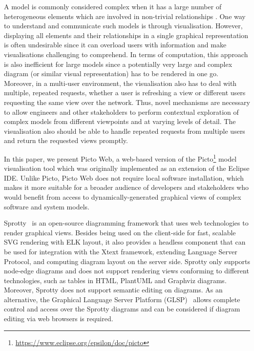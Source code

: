 \documentclass[preprint,12pt, a4paper]{elsarticle}
\begin{document}
A model is commonly considered complex when it has a large number of heterogeneous elements which are involved in non-trivial relationships \cite{boccara2010complex,klosterman2012complex}. One way to understand and communicate such models is through visualisation. However, displaying all elements and their relationships in a single graphical representation is often undesirable since it can overload users with information and make visualisations challenging to comprehend. In terms of computation, this approach is also inefficient for large models since a potentially very large and complex diagram (or similar visual representation) has to be rendered in one go. 
Moreover, in a multi-user environment, the visualisation also has to deal with multiple, repeated requests, whether a user is refreshing a view or different users requesting the same view over the network.
Thus, novel mechanisms are necessary to allow engineers and other stakeholders to perform contextual exploration of complex models from different viewpoints and at varying levels of detail. The visualisation also should be able to handle repeated requests from multiple users and return the requested views promptly.

In this paper, we present Picto Web, a web-based version of the Picto\footnote{\url{https://www.eclipse.org/epsilon/doc/picto}} \cite{dimitris2020picto} model visualisation tool which was originally implemented as an extension of the Eclipse IDE. Unlike Picto, Picto Web does not require local software installation, which makes it more suitable for a broader audience of developers and stakeholders who would benefit from access to dynamically-generated graphical views of complex software and system models.

Sprotty~\cite{sprotty2022git} is an open-source diagramming framework that uses web technologies to render graphical views. 
Besides being used on the client-side for fast, scalable SVG rendering with ELK layout, it also provides a headless component that can be used for integration with the Xtext framework, extending Language Server Protocol, and computing diagram layout on the server side. Sprotty only supports node-edge diagrams and does not support rendering views conforming to different technologies, such as tables in HTML, PlantUML and Graphviz diagrams. Moreover, Sprotty does not support semantic editing on diagrams. As an alternative, the Graphical Language Server Platform (GLSP)~\cite{eclipse2022glsp} allows complete control and access over the Sprotty diagrams and can be considered if diagram editing via web browsers is required.
\end{document}
